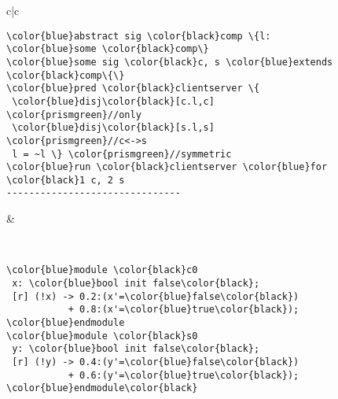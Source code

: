 
\begin{figure}
\bgroup
\def\arraystretch{0.8}
\begin{tabular}{c|c}
\begin{minipage}{0.45\linewidth}
{\footnotesize
\begin{Verbatim}[commandchars=\\\{\},codes={\catcode`$=3\catcode`^=7\catcode`_=8}]
\color{blue}abstract sig \color{black}comp \{l: \color{blue}some \color{black}comp\}
\color{blue}some sig \color{black}c, s \color{blue}extends \color{black}comp\{\}
\color{blue}pred \color{black}clientserver \{ 
 \color{blue}disj\color{black}[c.l,c] \color{prismgreen}//only
 \color{blue}disj\color{black}[s.l,s] \color{prismgreen}//c<->s
 l = ~l \} \color{prismgreen}//symmetric
\color{blue}run \color{black}clientserver \color{blue}for \color{black}1 c, 2 s
-------------------------------
\end{Verbatim}
}
\end{minipage}


& 
  
 \begin{minipage}{0.48\linewidth}
\end{minipage}
\\
\begin{minipage}{0.45\linewidth}
\vspace{0.05cm}
{\footnotesize
\begin{Verbatim}[commandchars=\\\{\},codes={\catcode`$=3\catcode`^=7\catcode`_=8}]
\color{blue}module \color{black}c0
 x: \color{blue}bool init false\color{black};
 [r] (!x) -> 0.2:(x'=\color{blue}false\color{black}) 
           + 0.8:(x'=\color{blue}true\color{black});
\color{blue}endmodule
\color{blue}module \color{black}s0
 y: \color{blue}bool init false\color{black};
 [r] (!y) -> 0.4:(y'=\color{blue}false\color{black}) 
           + 0.6:(y'=\color{blue}true\color{black});
\color{blue}endmodule\color{black}
\end{Verbatim}
}
\end{minipage}


\end{tabular}
\end{figure}
